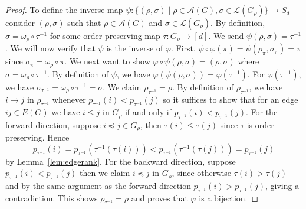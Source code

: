 \documentclass[11pt]{amsart}
\newcommand{\rk}[1][\pi]{p_{#1}}
\newcommand{\acyclic}[1]{\mathcal{A}(#1)}
\newcommand{\jhset}[1]{\mathcal{L}(#1)}
\begin{document}
\begin{proof}
    To define the inverse map $\psi:\{(\rho,\sigma) \mid \rho \in \mathcal{A}(G), \sigma \in \mathcal{L}(G_\rho)\} \to S_d$ 
    consider $(\rho,\sigma)$ such that $\rho \in \acyclic{G}$ and $\sigma \in \jhset{G_\rho}$. 
    By definition, $\sigma = \omega_\rho \circ \tau^{-1}$ for some order preserving map $\tau:G_\rho \to [d]$. We send $\psi(\rho,\sigma)= \tau^{-1}$. 
    We will now verify that $\psi$ is the inverse of $\varphi$. First, $\psi \circ \varphi (\pi) = \psi(\rho_\pi,\sigma_\pi) = \pi$ since $\sigma_\pi = \omega_\rho \circ \pi$. 
    We next want to show $\varphi \circ \psi (\rho,\sigma) = (\rho,\sigma)$ where $\sigma = \omega_\rho \circ \tau^{-1}$.
    By definition of $\psi$, we have $\varphi(\psi(\rho,\sigma))=\varphi(\tau^{-1})$. 
    For $\varphi(\tau^{-1})$, we have $\sigma_{\tau^{-1}} = \omega_\rho \circ \tau^{-1} = \sigma$.
    We claim $\rho_{\tau^{-1}} = \rho$. 
    By definition of $\rho_{\tau^{-1}}$, we have $i \to j$ in $\rho_{\tau^{-1}}$ whenever $\rk[\tau^{-1}](i) < \rk[\tau^{-1}](j)$
    so it suffices to show that for an edge $ij \in E(G)$ we have $i \leq j$ in $G_\rho$ if and only if  $\rk[\tau^{-1}](i) < \rk[\tau^{-1}](j)$.
    For the forward direction, suppose $i \preceq j \in G_\rho$, then $\tau(i) \leq \tau(j)$ since $\tau$ is order preserving.
    Hence
    \[
        \rk[\tau^{-1}](i) = \rk[\tau^{-1}](\tau^{-1} (\tau(i))) < \rk[\tau^{-1}](\tau^{-1} (\tau(j))) = \rk[\tau^{-1}](j)
    \]
    by Lemma~\ref{lem:edgerank}.
    For the backward direction, suppose $\rk[\tau^{-1}](i) < \rk[\tau^{-1}](j)$ then we claim $i \preceq j$ in
    $G_\rho$, since otherwise $\tau(i) > \tau(j)$ and by the same argument as the forward direction
    $\rk[\tau^{-1}](i) > \rk[\tau^{-1}](j)$, giving a contradiction.
    This shows $\rho_{\tau^{-1}} = \rho$ and proves that $\varphi$ is a bijection.


\end{proof}
\end{document}
